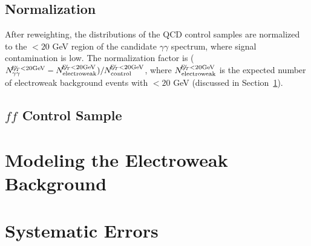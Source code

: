\documentclass[dissertation.tex]{subfiles}
\begin{document}
\subsection{Normalization}
\label{sec:Normalization}

After reweighting, the \MET distributions of the QCD control samples are normalized to the \MET $< 20$ GeV region of the candidate $\gamma\gamma$ \MET spectrum, where signal contamination is low.  The normalization factor is ($N_{\gamma\gamma}^{\not\!\! E_{T} < 20 \mathrm{GeV}} - N_{\mathrm{electroweak}}^{\not\!\! E_{T} < 20 \mathrm{GeV}})/N_{\mathrm{control}}^{\not\!\! E_{T} < 20 \mathrm{GeV}}$, where $N_{\mathrm{electroweak}}^{\not\!\! E_{T} < 20 \mathrm{GeV}}$ is the expected number of electroweak background events with \MET $< 20$ GeV (discussed in Section~\ref{sec:Modeling the Electroweak Background}).

\subsection{$\mathit{ff}$ Control Sample}
\label{ff Control Sample}



\section{Modeling the Electroweak Background}
\label{sec:Modeling the Electroweak Background}


\section{Systematic Errors}
\label{sec:Systematic Errors}

\end{document}

